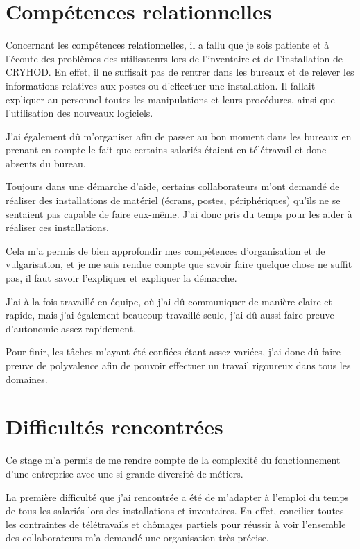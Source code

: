 \section{Compétences relationnelles}

Concernant les compétences relationnelles, il a fallu que je sois patiente et à l'écoute des problèmes des utilisateurs lors de l'inventaire et de l'installation de CRYHOD. 
En effet, il ne suffisait pas de rentrer dans les bureaux et de relever les informations relatives aux postes ou d'effectuer une installation. Il fallait expliquer au personnel toutes les manipulations et leurs procédures, ainsi que l'utilisation des nouveaux logiciels.

J'ai également dû m'organiser afin de passer au bon moment dans les bureaux en prenant en compte le fait que certains salariés étaient en télétravail et donc absents du bureau.

Toujours dans une démarche d'aide, certains collaborateurs m'ont demandé de réaliser des installations de matériel (écrans, postes, périphériques) qu'ils ne se sentaient pas capable de faire eux-même. J'ai donc pris du temps pour les aider à réaliser ces installations.

Cela m'a permis de bien approfondir mes compétences d'organisation et de vulgarisation, et je me suis rendue compte que savoir faire quelque chose ne suffit pas, il faut savoir l'expliquer et expliquer la démarche.

J'ai à la fois travaillé en équipe, où j'ai dû communiquer de manière claire et rapide, mais j'ai également beaucoup travaillé seule, j'ai dû aussi faire preuve d'autonomie assez rapidement.

Pour finir, les tâches m’ayant été confiées étant assez variées, j’ai donc dû faire preuve de polyvalence afin de pouvoir effectuer un travail rigoureux dans tous les domaines.

\section{Difficultés rencontrées}

Ce stage m'a permis de me rendre compte de la complexité du fonctionnement d'une entreprise avec une si grande diversité de métiers.

La première difficulté que j'ai rencontrée a été de m'adapter à l'emploi du temps de tous les salariés lors des installations et inventaires.
En effet, concilier toutes les contraintes de télétravails et chômages partiels pour réussir à voir l'ensemble des collaborateurs m'a demandé une organisation très précise.

